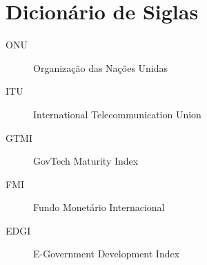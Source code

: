 \section*{Dicionário de Siglas}

\begin{description}
    \item[ONU] Organização das Nações Unidas
    \item[ITU] International Telecommunication Union
    \item[GTMI] GovTech Maturity Index
    \item[FMI] Fundo Monetário Internacional
    \item[EDGI] E-Government Development Index
\end{description}